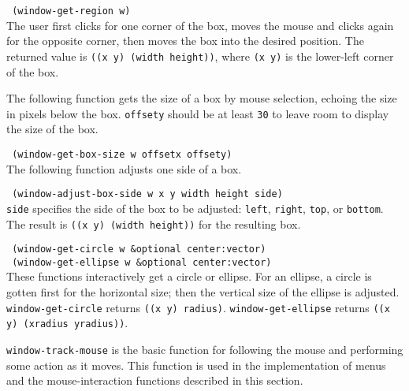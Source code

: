 {\tt \hspace*{0.5in} (window-get-region w)} \\

\vspace{-0.15in}
The user first clicks for one corner of the box, moves the
mouse and clicks again for the opposite corner, then moves the box into
the desired position. The returned value is \linebreak
{\tt ((x y) (width height))},
where {\tt (x y)} is the lower-left corner of the box.

The following function gets the size of a box by mouse selection,
echoing the size in pixels below the box.  {\tt offsety}
should be at least {\tt 30} to leave room to display the size of the box.

{\tt \hspace*{0.5in} (window-get-box-size w offsetx offsety)} \\


The following function adjusts one side of a box.

{\tt \hspace*{0.5in} (window-adjust-box-side w x y width height side)} \\

\vspace{-0.15in}
{\tt side} specifies the side of the box to be adjusted: {\tt left},
{\tt right}, {\tt top}, or {\tt bottom}.  The result is
{\tt ((x y) (width height))} for the resulting box.

{\tt \hspace*{0.5in} (window-get-circle w \&optional center:vector)} \\
{\tt \hspace*{0.5in} (window-get-ellipse w \&optional center:vector)} \\
These functions interactively get a circle or ellipse.  For an ellipse,
a circle is gotten first for the horizontal size; then the vertical
size of the ellipse is adjusted.
{\tt window-get-circle} returns {\tt ((x y) radius)}.
{\tt window-get-ellipse} returns {\tt ((x y) (xradius yradius))}.


{\tt window-track-mouse} is the basic function for following the mouse
and performing some action as it moves.  This function is used in
the implementation of menus and the mouse-interaction functions described in
this section.

